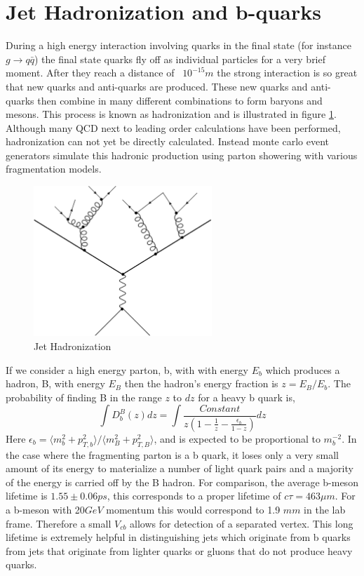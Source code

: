 \section{Jet Hadronization and b-quarks}
During a high energy interaction involving quarks in the final state (for instance $g\rightarrow q\bar{q}$)
the final state quarks fly off as individual particles for a very brief moment. After they reach
a distance of ~$10^{-15}m$ the strong interaction is so great that new quarks and anti-quarks
are produced. These new quarks and anti-quarks then combine in many different combinations
to form baryons and mesons. This process is known as hadronization 
and is illustrated in figure \ref{fig:JetHadronization}. Although many QCD
next to leading order calculations have been performed, hadronization can not yet be directly calculated.
Instead monte carlo event generators simulate this hadronic production using parton 
showering with various fragmentation models.%

\begin{figure}[t]
  \centering
	\includegraphics[width=0.6\textwidth]{images/hadronization.png}
  	\caption[Jet Hadronization]
   	{Jet Hadronization}
	\label{fig:JetHadronization}
\end{figure}

If we consider a high energy parton, b, with with energy $E_{b}$ which produces a hadron, B, with energy $E_{B}$
then the hadron's energy fraction is $z=E_{B}/E_{b}$. The probability of finding B in the range
$z$ to $dz$ for a heavy b quark is,
\begin{equation}
\int{D_{b}^{B}(z)dz}=\int{\frac{Constant}{z(1-\frac{1}{z}-\frac{\epsilon_{b}}{1-z})}dz}
\end{equation}
Here $\epsilon_{b}=\langle m_{b}^{2}+ p_{T,b}^{2} \rangle/\langle m_{B}^{2}+ p_{T,B}^{2} \rangle$, and is expected to be proportional to $m_{b}^{-2}$.
In the case where the fragmenting parton is a b quark, it loses only a very small amount
of its energy to materialize a number of light quark pairs and a majority of the energy is
carried off by the B hadron.  
For comparison, the average b-meson lifetime is $1.55\pm 0.06 ps$, this corresponds to a proper lifetime of
$c\tau=463\mu m$. For a b-meson with 20$GeV$ momentum this would correspond to
1.9 $mm$ in the lab frame. Therefore a small $V_{cb}$ allows for detection of a separated vertex. 
This long lifetime is extremely helpful in distinguishing jets which
originate from b quarks from jets that originate from lighter quarks or gluons that do not produce heavy quarks. 

